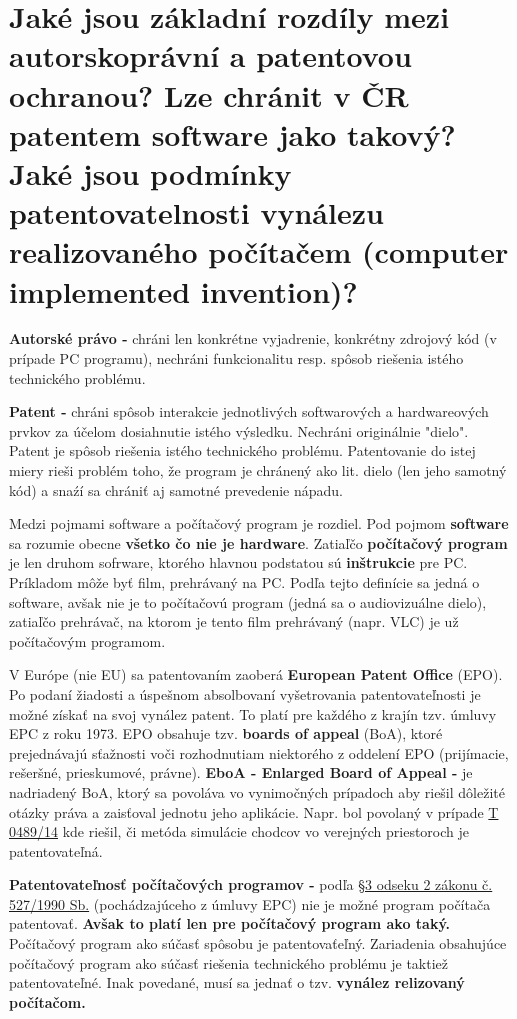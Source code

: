 \section{Jaké jsou základní rozdíly mezi autorskoprávní a patentovou ochranou? Lze chránit v ČR patentem software jako takový? Jaké jsou podmínky patentovatelnosti vynálezu realizovaného počítačem (computer implemented invention)?}

\textbf{Autorské právo - } chráni len konkrétne vyjadrenie, konkrétny zdrojový kód (v prípade PC programu), nechráni funkcionalitu resp. spôsob riešenia istého technického problému. 

\textbf{Patent - } chráni spôsob interakcie jednotlivých softwarových a hardwareových prvkov za účelom dosiahnutie istého výsledku. Nechráni originálnie "dielo". Patent je spôsob riešenia istého technického problému. Patentovanie do istej miery rieši problém toho, že program je chránený ako lit. dielo (len jeho samotný kód) a snaźí sa chrániť aj samotné prevedenie nápadu.

Medzi pojmami software a počítačový program je rozdiel. Pod pojmom \textbf{software} sa rozumie obecne \textbf{všetko čo nie je hardware}. Zatiaľčo \textbf{počítačový program} je len druhom sofrware, ktorého hlavnou podstatou sú \textbf{inštrukcie} pre PC. Príkladom môže byť film, prehrávaný na PC. Podľa tejto definície sa jedná o software, avšak nie je to počítačovú program (jedná sa o audiovizuálne dielo), zatiaľčo prehrávač, na ktorom je tento film prehrávaný (napr. VLC) je už počítačovým programom.

V Európe (nie EU) sa patentovaním zaoberá \textbf{European Patent Office} (EPO). Po podaní žiadosti a úspešnom absolbovaní vyšetrovania patentovateľnosti je možné získať na svoj vynález patent. To platí pre každého z krajín tzv. úmluvy EPC z roku 1973. EPO obsahuje tzv. \textbf{boards of appeal} (BoA), ktoré prejednávajú sťažnosti voči rozhodnutiam niektorého z oddelení EPO (prijímacie, rešeršné, prieskumové, právne). \textbf{EboA - Enlarged Board of Appeal - } je nadriadený BoA, ktorý sa povoláva vo vynimočných prípadoch aby riešil dôležité otázky práva a zaisťoval jednotu jeho aplikácie. Napr. bol povolaný v prípade \href{https://www.epo.org/law-practice/case-law-appeals/recent/t140489eu2.html}{T 0489/14} kde riešil, či metóda simulácie chodcov vo verejných priestoroch je patentovateľná.

\textbf{Patentovateľnosť počítačových programov - } podľa \href{https://www.zakonyprolidi.cz/cs/1990-527#:~:text=c)%20plany%2C%20pravidla%20a%20zpusoby%20vykonavani%20dusevni%20cinnosti%2C%20hrani%20her%20nebo%20vykonavani%20obchodni%20cinnosti%2C%20jakoz%20i%20programy%20pocitacu%3B}{§3 odseku 2 zákonu č. 527/1990 Sb.} (pochádzajúceho z úmluvy EPC) nie je možné program počítača patentovať. \textbf{Avšak to platí len pre počítačový program ako taký.} Počítačový program ako súčasť spôsobu je patentovaťeľný. Zariadenia obsahujúce počítačový program ako súčasť riešenia technického problému je taktiež patentovateľné. Inak povedané, musí sa jednať o tzv. \textbf{vynález relizovaný počítačom.}

